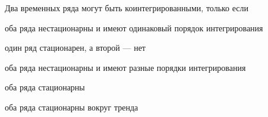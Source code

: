 
\begin{question}
Два временных ряда могут быть коинтегрированными, только если
\begin{answerlist}[2]
  \item оба ряда нестационарны и имеют одинаковый порядок интегрирования
  \item один ряд стационарен, а второй --- нет
  \item оба ряда нестационарны и имеют разные порядки интегрирования
  \item оба ряда стационарны
  \item оба ряда стационарны вокруг тренда
\end{answerlist}
\end{question}


